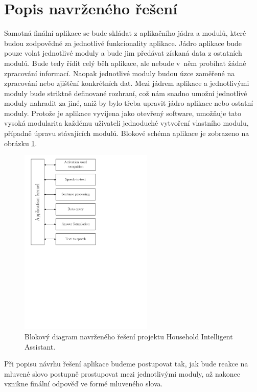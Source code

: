 \documentclass[12pt,a4paper]{article}
\begin{document}
\section*{Popis navrženého řešení}
Samotná finální aplikace se bude skládat z aplikačního jádra a modulů, které budou zodpovědné za jednotlivé funkcionality aplikace. Jádro aplikace bude pouze volat jednotlivé moduly a bude jim předávat získaná data z ostatních modulů. Bude tedy řídit celý běh aplikace, ale nebude v~něm probíhat žádné zpracování informací. Naopak jednotlivé moduly budou úzce zaměřené na zpracování nebo zjištění konkrétních dat. Mezi jádrem aplikace a jednotlivými moduly bude striktně definované rozhraní, což nám snadno umožní jednotlivé moduly nahradit za jiné, aniž by bylo třeba upravit jádro aplikace nebo ostatní moduly. Protože je aplikace vyvíjena jako otevřený software, umožňuje tato vysoká modularita každému uživateli jednoduché vytvoření vlastního modulu, případně úpravu stávajících modulů. Blokové schéma aplikace je zobrazeno na obrázku \ref{fig:diagram api}.

\begin{figure}[ht]
	\begin{center}
	\includegraphics[height = 9cm]{blockDiagram.pdf}
	\caption{Blokový diagram navrženého řešení projektu Household Intelligent Assistant.}
	\label{fig:diagram api}
	\end{center}
\end{figure}

Při popisu návrhu řešení aplikace budeme postupovat tak, jak bude reakce na mluvené slovo postupně prostupovat mezi jednotlivými moduly, až nakonec vznikne finální odpověď ve formě mluveného slova.
\end{document}
